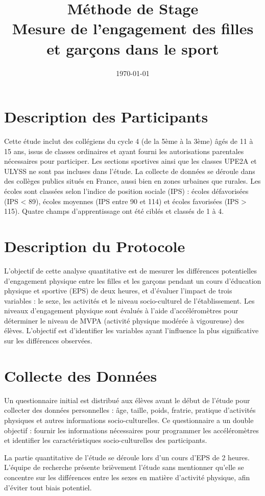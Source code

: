 \documentclass[12pt,a4paper]{article}
\title{
	\textbf{Méthode de Stage}\\[0.5cm]
	\textbf{Mesure de l'engagement des filles et garçons dans le sport}\\
	\vspace{2cm}
}
\date{\today}
\begin{document}
	\maketitle
	\section{Description des Participants}
	Cette étude inclut des collégiens du cycle 4 (de la 5ème à la 3ème) âgés de 11 à 15 ans, issus de classes ordinaires et ayant fourni les autorisations parentales nécessaires pour participer. Les sections sportives ainsi que les classes UPE2A et ULYSS ne sont pas incluses dans l’étude. La collecte de données se déroule dans des collèges publics situés en France, aussi bien en zones urbaines que rurales. Les écoles sont classées selon l’indice de position sociale (IPS) : écoles défavorisées (IPS < 89), écoles moyennes (IPS entre 90 et 114) et écoles favorisées (IPS > 115). Quatre champs d'apprentissage ont été ciblés et classés de 1 à 4.
	
	\section{Description du Protocole}
	L'objectif de cette analyse quantitative est de mesurer les différences potentielles d’engagement physique entre les filles et les garçons pendant un cours d’éducation physique et sportive (EPS) de deux heures, et d'évaluer l'impact de trois variables : le sexe, les activités et le niveau socio-culturel de l’établissement. Les niveaux d'engagement physique sont évalués à l'aide d'accéléromètres pour déterminer le niveau de MVPA (activité physique modérée à vigoureuse) des élèves. L'objectif est d'identifier les variables ayant l'influence la plus significative sur les différences observées.
	
	\section{Collecte des Données}
	Un questionnaire initial est distribué aux élèves avant le début de l’étude pour collecter des données personnelles : âge, taille, poids, fratrie, pratique d’activités physiques et autres informations socio-culturelles. Ce questionnaire a un double objectif : fournir les informations nécessaires pour programmer les accéléromètres et identifier les caractéristiques socio-culturelles des participants.
	
	La partie quantitative de l’étude se déroule lors d’un cours d’EPS de 2 heures. L’équipe de recherche présente brièvement l'étude sans mentionner qu'elle se concentre sur les différences entre les sexes en matière d'activité physique, afin d'éviter tout biais potentiel.
	
\end{document}
